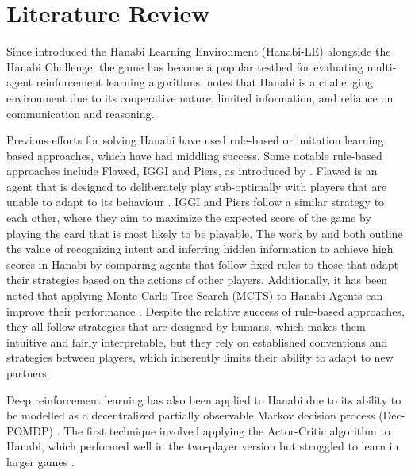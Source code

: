 \section{Literature Review}
Since \textcite{bardHanabiChallengeNew2020a} introduced the Hanabi Learning Environment (Hanabi-LE) alongside the Hanabi Challenge, the game has become a popular testbed for evaluating multi-agent reinforcement learning algorithms. \textcite{bardHanabiChallengeNew2020a} notes that Hanabi is a challenging environment due to its cooperative nature, limited information, and reliance on communication and reasoning.

Previous efforts for solving Hanabi have used rule-based \cite{coxHowMakePerfect2015,walton-riversEvaluatingModellingHanabiPlaying2017} or imitation learning \cite{osawaSolvingHanabiEstimating2015} based approaches, which have had middling success.
Some notable rule-based approaches include Flawed, IGGI and Piers, as introduced by \textcite{walton-riversEvaluatingModellingHanabiPlaying2017}. Flawed is an agent that is designed to deliberately play sub-optimally with players that are unable to adapt to its behaviour \cite{canaanDiverseAgentsAdHoc2019}. IGGI and Piers follow a similar strategy to each other, where they aim to maximize the expected score of the game by playing the card that is most likely to be playable. The work by \textcite{osawaSolvingHanabiEstimating2015} and \textcite{walton-riversEvaluatingModellingHanabiPlaying2017} both outline the value of recognizing intent and inferring hidden information to achieve high scores in Hanabi by comparing agents that follow fixed rules to those that adapt their strategies based on the actions of other players. Additionally, it has been noted that applying Monte Carlo Tree Search (MCTS) to Hanabi Agents can improve their performance \cite{bardHanabiChallengeNew2020a}. Despite the relative success of rule-based approaches, they all follow strategies that are designed by humans, which makes them intuitive and fairly interpretable, but they rely on established conventions and strategies between players, which inherently limits their ability to adapt to new partners.

Deep reinforcement learning has also been applied to Hanabi due to its ability to be modelled as a decentralized partially observable Markov decision process (Dec-POMDP) \cite{bardHanabiChallengeNew2020a,oliehoekConciseIntroductionDecentralized2016}. The first technique involved applying the Actor-Critic algorithm to Hanabi, which performed well in the two-player version but struggled to learn in larger games \cite{bardHanabiChallengeNew2020a}.

